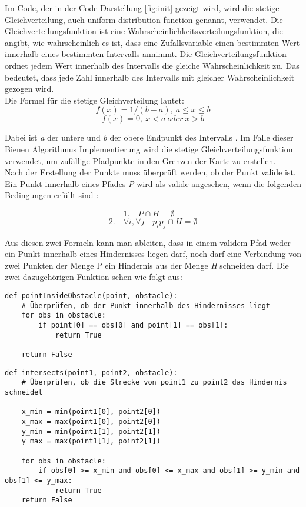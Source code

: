 Im Code, der in der Code Darstellung \ref{fig:init} gezeigt wird, wird die stetige Gleichverteilung, auch uniform distribution function genannt, verwendet. Die Gleichverteilungsfunktion ist eine Wahrscheinlichkeitsverteilungsfunktion, die angibt, wie wahrscheinlich es ist, dass eine Zufallsvariable einen bestimmten Wert innerhalb eines bestimmten Intervalls annimmt.
Die Gleichverteilungsfunktion ordnet jedem Wert innerhalb des Intervalls die gleiche Wahrscheinlichkeit zu. Das bedeutet, dass jede Zahl innerhalb des Intervalls mit gleicher Wahrscheinlichkeit gezogen wird.\\
Die Formel für die stetige Gleichverteilung lautet:
\[f(x) = 1/(b-a),\: a \leq x \leq b\]
\[f(x) = 0,\:x < a \:oder\: x > b\]

Dabei ist \emph{a} der untere und \emph{b} der obere Endpunkt des Intervalls \cite{casella2021statistical}. Im Falle dieser Bienen Algorithmus Implementierung wird die stetige Gleichverteilungsfunktion verwendet, um zufällige Pfadpunkte in den Grenzen der Karte zu erstellen.\\
Nach der Erstellung der Punkte muss überprüft werden, ob der Punkt valide ist. Ein Punkt innerhalb eines Pfades \emph{P} wird als valide angesehen, wenn die folgenden Bedingungen erfüllt sind \cite{Darwish2018}:

\[1. \quad P \cap H = \emptyset \quad\]
\[2. \quad \forall i, \forall j \quad \overline{p_i p_j} \cap H = \emptyset\]

Aus diesen zwei Formeln kann man ableiten, dass in einem validem Pfad weder ein Punkt innerhalb eines Hindernisses liegen darf, noch darf eine Verbindung von zwei Punkten der Menge P ein Hindernis aus der Menge \emph{H} schneiden darf.
Die zwei dazugehörigen Funktion sehen wie folgt aus:

\begin{verbatim}
def pointInsideObstacle(point, obstacle):
    # Überprüfen, ob der Punkt innerhalb des Hindernisses liegt
    for obs in obstacle:
        if point[0] == obs[0] and point[1] == obs[1]:
            return True
                
    return False
\end{verbatim}
\vspace*{-3mm}
\vspace*{3mm}

\begin{verbatim}
def intersects(point1, point2, obstacle):
    # Überprüfen, ob die Strecke von point1 zu point2 das Hindernis schneidet

    x_min = min(point1[0], point2[0])
    x_max = max(point1[0], point2[0])
    y_min = min(point1[1], point2[1])
    y_max = max(point1[1], point2[1])

    for obs in obstacle:
        if obs[0] >= x_min and obs[0] <= x_max and obs[1] >= y_min and obs[1] <= y_max:
            return True
    return False
\end{verbatim}
\vspace*{-3mm}
\vspace*{3mm}

